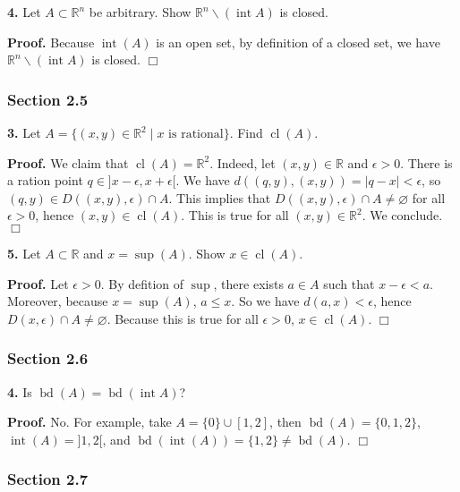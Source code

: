 \documentclass{article}
\begin{document}
    \textbf{4.} Let $A \subset \mathbb{R}^n$ be arbitrary. Show
$\mathbb{R}^n\backslash(\operatorname{int} A)$ is closed.

\textbf{Proof.} Because $\operatorname{int}(A)$ is an open set, by
definition of a closed set, we have
$\mathbb{R}^n\backslash (\operatorname{int} A)$ is closed. $\Box$

    \subsubsection*{Section 2.5}\label{section-2.5}

    \textbf{3.} Let
$A = \{(x,y)\in \mathbb{R}^2 \mid x \text{ is rational}\}$. Find
$\operatorname{cl}(A)$.

\textbf{Proof.} We claim that $\operatorname{cl}(A) = \mathbb{R}^2$.
Indeed, let $(x,y)\in \mathbb{R}$ and $\epsilon > 0$. There is a ration
point $q \in ]x-\epsilon, x+\epsilon[$. We have
$d((q,y),(x,y)) = |q-x| < \epsilon$, so
$(q,y) \in D((x,y),\epsilon) \cap A$. This implies that
$D((x,y),\epsilon) \cap A \neq \varnothing$ for all $\epsilon >0$, hence
$(x,y) \in \operatorname{cl}(A)$. This is true for all
$(x,y)\in \mathbb{R}^2$. We conclude. $\Box$

    \textbf{5.} Let $A\subset \mathbb{R}$ and $x= \sup(A)$. Show
$x\in \operatorname{cl}(A)$.

\textbf{Proof.} Let $\epsilon > 0$. By defition of $\sup$, there exists
$a \in A$ such that $x - \epsilon < a$. Moreover, because $x = \sup(A)$,
$a\le x$. So we have $d(a,x) < \epsilon$, hence
$D(x,\epsilon)\cap A \neq \varnothing$. Because this is true for all
$\epsilon > 0$, $x\in \operatorname{cl}(A)$. $\Box$

    \subsubsection*{Section 2.6}\label{section-2.6}

    \textbf{4.} Is
$\operatorname{bd}(A) = \operatorname{bd}(\operatorname{int} A)$?

\textbf{Proof.} No. For example, take $A = \{0\} \cup [1,2]$, then
$\operatorname{bd}(A) = \{0,1,2\}$, $\operatorname{int}(A) = ]1,2[$, and
$\operatorname{bd}(\operatorname{int}(A)) = \{1,2\}\neq \operatorname{bd}(A)$.
$\Box$

    \subsubsection*{Section 2.7}\label{section-2.7}
\end{document}
